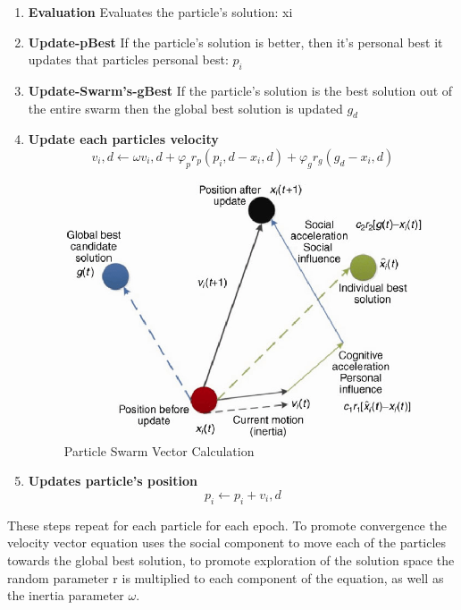 \documentclass[twocolumn]{article}
\begin{document}
\begin{enumerate}


    \item \textbf{Evaluation}
Evaluates the particle’s solution: xi

    \item \textbf{Update-pBest}
If the particle’s solution is better, then it’s personal best it updates that particles personal best: $p_i$

    \item\textbf{ Update-Swarm’s-gBest}
If the particle’s solution is the best solution out of the entire swarm then the global best solution is updated $g_d$

    \item \textbf{Update each particles velocity}
$$v_i,d ← \omega v_i,d + \varphi _p r_p (p_i,d-x_i,d) + \varphi_ g r_g (g_d-x_i,d)$$


\begin{figure}[h!]
\includegraphics[scale=0.3]{Images/PSO.png} 
\caption{Particle Swarm Vector Calculation}
\end{figure}


    \item \textbf{Updates particle’s position}
 	$$p_i ← p_i + v_i,d$$
\end{enumerate}

These steps repeat for each particle for each epoch. To promote convergence the velocity vector equation uses the social component to move each of the particles towards the global best solution, to promote exploration of the solution space the random parameter r is multiplied to each component of the equation, as well as the inertia parameter $\omega$.
\end{document}
